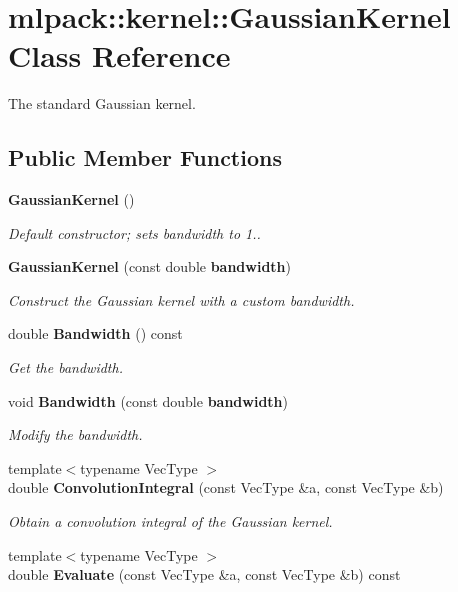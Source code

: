 \section{mlpack\-:\-:kernel\-:\-:Gaussian\-Kernel Class Reference}
\label{classmlpack_1_1kernel_1_1GaussianKernel}


The standard Gaussian kernel.  


\subsection*{Public Member Functions}
\begin{DoxyCompactItemize}
\item 
{\bf Gaussian\-Kernel} ()
\begin{DoxyCompactList}\small\item\em Default constructor; sets bandwidth to 1.. \end{DoxyCompactList}\item 
{\bf Gaussian\-Kernel} (const double {\bf bandwidth})
\begin{DoxyCompactList}\small\item\em Construct the Gaussian kernel with a custom bandwidth. \end{DoxyCompactList}\item 
double {\bf Bandwidth} () const 
\begin{DoxyCompactList}\small\item\em Get the bandwidth. \end{DoxyCompactList}\item 
void {\bf Bandwidth} (const double {\bf bandwidth})
\begin{DoxyCompactList}\small\item\em Modify the bandwidth. \end{DoxyCompactList}\item 
{\footnotesize template$<$typename Vec\-Type $>$ }\\double {\bf Convolution\-Integral} (const Vec\-Type \&a, const Vec\-Type \&b)
\begin{DoxyCompactList}\small\item\em Obtain a convolution integral of the Gaussian kernel. \end{DoxyCompactList}\item 
{\footnotesize template$<$typename Vec\-Type $>$ }\\double {\bf Evaluate} (const Vec\-Type \&a, const Vec\-Type \&b) const 

\end{DoxyCompactItemize}

